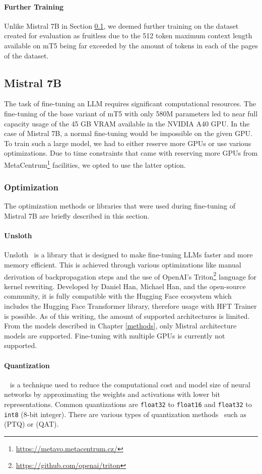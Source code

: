 \documentclass[english, ba, kiv, he, iso690numb, pdf, viewonly]{fasthesis}
\begin{document}
\paragraph{Further Training}
Unlike Mistral 7B in Section \ref{impl:m7b}, we deemed further training on the dataset created for evaluation as fruitless due to the 512 token maximum context length available on mT5 being far exceeded by the amount of tokens in each of the pages of the dataset.
\subsection{Mistral 7B} \label{impl:m7b}
The task of fine-tuning an LLM requires significant computational resources. The fine-tuning of the base variant of mT5 with only 580M parameters led to near full capacity usage of the 45 GB VRAM available in the NVIDIA A40 GPU. In the case of Mistral 7B, a normal fine-tuning would be impossible on the given GPU. To train such a large model, we had to either reserve more GPUs or use various optimizations. Due to time constraints that came with reserving more GPUs from MetaCentrum\footnote{\url{https://metavo.metacentrum.cz/}} facilities, we opted to use the latter option.
\subsubsection{Optimization}
The optimization methods or libraries that were used during fine-tuning of Mistral 7B are briefly described in this section.
\paragraph{Unsloth}\label{impl:unsloth}
Unsloth~\cite{unsloth} is a library that is designed to make fine-tuning LLMs faster and more memory efficient. This is achieved through various optimizations like manual derivation of backpropagation steps and the use of OpenAI's Triton\footnote{\url{https://github.com/openai/triton}} language for kernel rewriting. Developed by Daniel Han, Michael Han, and the open-source community, it is fully compatible with the Hugging Face ecosystem which includes the Hugging Face Transformer library, therefore usage with HFT Trainer is possible. As of this writing, the amount of supported architectures is limited. From the models described in Chapter \ref{methods}, only Mistral architecture models are supported. Fine-tuning with multiple GPUs is currently not supported.
\paragraph{Quantization}
~\cite{jacob2017quantization} is a technique used to reduce the computational cost and model size of neural networks by approximating the weights and activations with lower bit representations. Common quantizations are \texttt{float32} to \texttt{float16} and \texttt{float32} to \texttt{int8} (8-bit integer). There are various types of quantization methods~\cite{gholami2021survey} such as  (PTQ) or  (QAT). 
\end{document}
